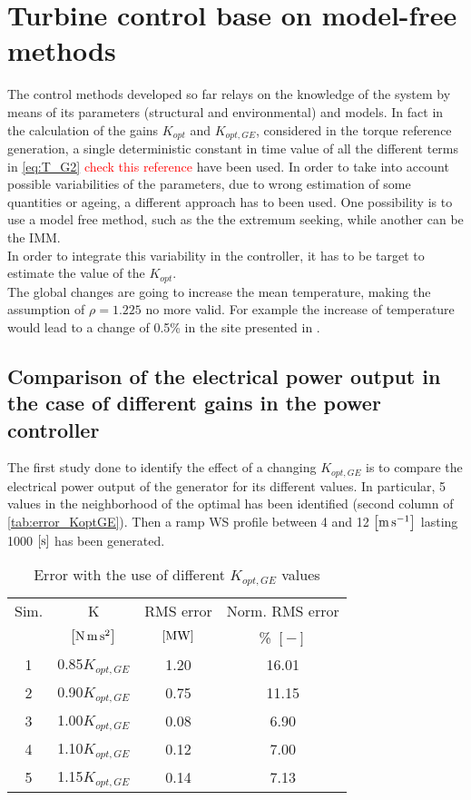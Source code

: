 \section{Turbine control base on model-free methods}\label{sec:c_other_controls}
The control methods developed so far relays on the knowledge of the system by means of its parameters (structural and environmental) and models. In fact in the calculation of the gains $K_{opt}$ and $K_{opt,GE}$, considered in the torque reference generation, a single deterministic constant in time value of all the different terms in \autoref{eq:T_G2} \textcolor{red}{check this reference} have been used. In order to take into account possible variabilities of the parameters, due to wrong estimation of some quantities or ageing, a different approach has to been used. One possibility is to use a model free method, such as the the extremum seeking, while another can be the \acrfull{IMM}.\\
In order to integrate this variability in the controller, it has to be target to estimate the value of the $K_{opt}$. \\
The global changes are going to increase the mean temperature, making the assumption of $\rho=1.225$ no more valid. For example the increase of temperature would lead to a change of 0.5\% in the site presented in \cite{en12112038}.

\subsection{Comparison of the electrical power output in the case of different gains in the power controller}\label{subsec:c_different_KoptGE}
The first study done to identify the effect of a changing $K_{opt,GE}$ is to compare the electrical power output of the generator for its  different values. In particular, 5 values in the neighborhood of the optimal has been identified (second column of \autoref{tab:error_KoptGE}). Then a ramp WS profile between 4 and 12 $\left[\si{\meter\per\second}\right]$ lasting 1000 $\left[\si{\second}\right]$ has been generated.
\begin{table}[htb]
  \centering
  \begin{tabular}{cc|cc}
  \toprule
  Sim. & K & RMS error & Norm. RMS error\\ 
   &  $\left[\si{\newton \meter \square \second}\right]$ & $\left[\si{\mega\watt}\right]$ & \% $\left[-\right]$ \\ \midrule
  1 & 0.85$K_{opt,GE}$  & 1.20 & 16.01\\
  2 & 0.90$K_{opt,GE}$  & 0.75 & 11.15\\
  3 & 1.00$K_{opt,GE}$  & 0.08 & 6.90\\
  4 & 1.10$K_{opt,GE}$  & 0.12 & 7.00\\
  5 & 1.15$K_{opt,GE}$  & 0.14 & 7.13\\ \bottomrule
  \end{tabular}
  \caption{Error with the use of different $K_{opt,GE}$ values}
  \label{tab:error_KoptGE}
\end{table}

